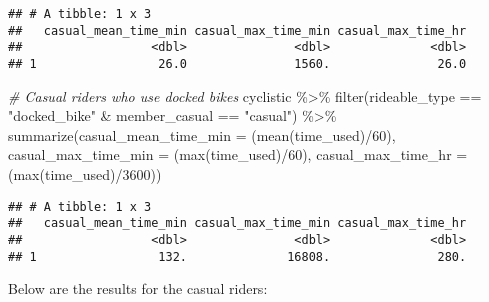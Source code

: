\documentclass[
]{article}
\newenvironment{Shaded}{\begin{snugshade}}{\end{snugshade}}
\newcommand{\AttributeTok}[1]{\textcolor[rgb]{0.77,0.63,0.00}{#1}}
\newcommand{\CommentTok}[1]{\textcolor[rgb]{0.56,0.35,0.01}{\textit{#1}}}
\newcommand{\DecValTok}[1]{\textcolor[rgb]{0.00,0.00,0.81}{#1}}
\newcommand{\FunctionTok}[1]{\textcolor[rgb]{0.00,0.00,0.00}{#1}}
\newcommand{\NormalTok}[1]{#1}
\newcommand{\SpecialCharTok}[1]{\textcolor[rgb]{0.00,0.00,0.00}{#1}}
\newcommand{\StringTok}[1]{\textcolor[rgb]{0.31,0.60,0.02}{#1}}
\begin{document}
\begin{verbatim}
## # A tibble: 1 x 3
##   casual_mean_time_min casual_max_time_min casual_max_time_hr
##                  <dbl>               <dbl>              <dbl>
## 1                 26.0               1560.               26.0
\end{verbatim}

\begin{Shaded}
\begin{Highlighting}[]
\CommentTok{\# Casual riders who use docked bikes}
\NormalTok{cyclistic }\SpecialCharTok{\%\textgreater{}\%} \FunctionTok{filter}\NormalTok{(rideable\_type }\SpecialCharTok{==} \StringTok{"docked\_bike"} \SpecialCharTok{\&}\NormalTok{ member\_casual }\SpecialCharTok{==} \StringTok{"casual"}\NormalTok{) }\SpecialCharTok{\%\textgreater{}\%} 
                                                    \FunctionTok{summarize}\NormalTok{(}\AttributeTok{casual\_mean\_time\_min =}\NormalTok{ (}\FunctionTok{mean}\NormalTok{(time\_used)}\SpecialCharTok{/}\DecValTok{60}\NormalTok{),}
                                                              \AttributeTok{casual\_max\_time\_min =}\NormalTok{ (}\FunctionTok{max}\NormalTok{(time\_used)}\SpecialCharTok{/}\DecValTok{60}\NormalTok{),}
                                                              \AttributeTok{casual\_max\_time\_hr =}\NormalTok{ (}\FunctionTok{max}\NormalTok{(time\_used)}\SpecialCharTok{/}\DecValTok{3600}\NormalTok{))}
\end{Highlighting}
\end{Shaded}

\begin{verbatim}
## # A tibble: 1 x 3
##   casual_mean_time_min casual_max_time_min casual_max_time_hr
##                  <dbl>               <dbl>              <dbl>
## 1                 132.              16808.               280.
\end{verbatim}

Below are the results for the casual riders:
\end{document}
